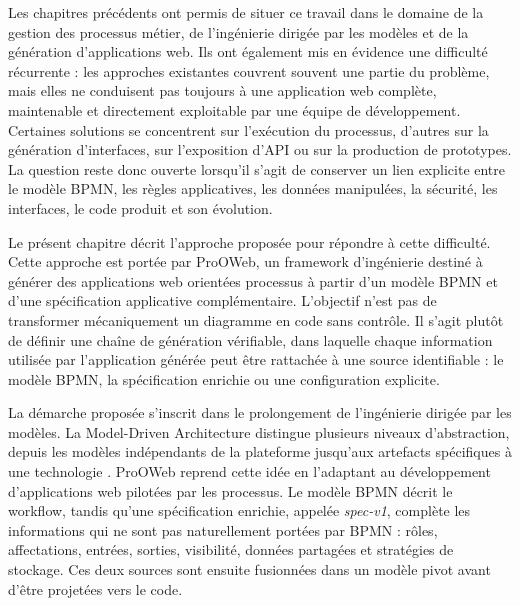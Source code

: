 \label{chap:approche-prooweb}


Les chapitres précédents ont permis de situer ce travail dans le domaine de la gestion des processus métier, de l'ingénierie dirigée par les modèles et de la génération d'applications web. Ils ont également mis en évidence une difficulté récurrente : les approches existantes couvrent souvent une partie du problème, mais elles ne conduisent pas toujours à une application web complète, maintenable et directement exploitable par une équipe de développement. Certaines solutions se concentrent sur l'exécution du processus, d'autres sur la génération d'interfaces, sur l'exposition d'API ou sur la production de prototypes. La question reste donc ouverte lorsqu'il s'agit de conserver un lien explicite entre le modèle BPMN, les règles applicatives, les données manipulées, la sécurité, les interfaces, le code produit et son évolution.

Le présent chapitre décrit l'approche proposée pour répondre à cette difficulté. Cette approche est portée par ProOWeb, un framework d'ingénierie destiné à générer des applications web orientées processus à partir d'un modèle BPMN et d'une spécification applicative complémentaire. L'objectif n'est pas de transformer mécaniquement un diagramme en code sans contrôle. Il s'agit plutôt de définir une chaîne de génération vérifiable, dans laquelle chaque information utilisée par l'application générée peut être rattachée à une source identifiable : le modèle BPMN, la spécification enrichie ou une configuration explicite.

La démarche proposée s'inscrit dans le prolongement de l'ingénierie dirigée par les modèles. La Model-Driven Architecture distingue plusieurs niveaux d'abstraction, depuis les modèles indépendants de la plateforme jusqu'aux artefacts spécifiques à une technologie \cite{omg2014mda,jezequel2012}. ProOWeb reprend cette idée en l'adaptant au développement d'applications web pilotées par les processus. Le modèle BPMN décrit le workflow, tandis qu'une spécification enrichie, appelée \textit{spec-v1}, complète les informations qui ne sont pas naturellement portées par BPMN : rôles, affectations, entrées, sorties, visibilité, données partagées et stratégies de stockage. Ces deux sources sont ensuite fusionnées dans un modèle pivot avant d'être projetées vers le code.

